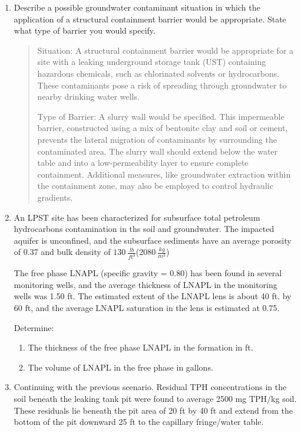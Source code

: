 \documentclass[12pt]{article}
\begin{document}
\begin{enumerate}
\item Describe a possible groundwater contaminant situation in which the application of a structural containment barrier would be appropriate.  State what type of barrier you would specify.

\begin{quote} 
Situation: A structural containment barrier would be appropriate for a site with a leaking underground storage tank (UST) containing hazardous chemicals, such as chlorinated solvents or hydrocarbons. These contaminants pose a risk of spreading through groundwater to nearby drinking water wells.

Type of Barrier: A slurry wall would be specified. This impermeable barrier, constructed using a mix of bentonite clay and soil or cement, prevents the lateral migration of contaminants by surrounding the contaminated area. The slurry wall should extend below the water table and into a low-permeability layer to ensure complete containment. Additional measures, like groundwater extraction within the containment zone, may also be employed to control hydraulic gradients.

\end{quote}
\clearpage
\item  An LPST site has been characterized for subsurface total petroleum hydrocarbons contamination in ths soil and groundwater. The impacted aquifer is unconfined, and the subsurface sediments have an average porosity of 0.37 and bulk density of $130~\frac{lb}{ft^3}$($2080~\frac{kg}{m^3}$)

The free phase LNAPL (specific gravity = 0.80) has been found in several monitoring wells, and the average thickness of LNAPL in the monitoring wells was 1.50 ft.  The estimated extent of the LNAPL lens is about 40 ft. by 60 ft, and the average LNAPL saturation in the lens is estimated at 0.75.

Determine:
\begin{enumerate}
\item The thickness of the free phase LNAPL in the formation in ft.
\item The volume of LNAPL in the free phase in gallons.
\end{enumerate}

\clearpage
\item Continuing with the previous scenario. Residual TPH concentrations in the soil beneath the leaking tank pit were found to average 2500 mg TPH/kg soil.  These residuals lie beneath the pit area of 20 ft by 40 ft and extend from the bottom of the pit downward 25 ft to the capillary fringe/water table.


\end{enumerate}
\end{document}
